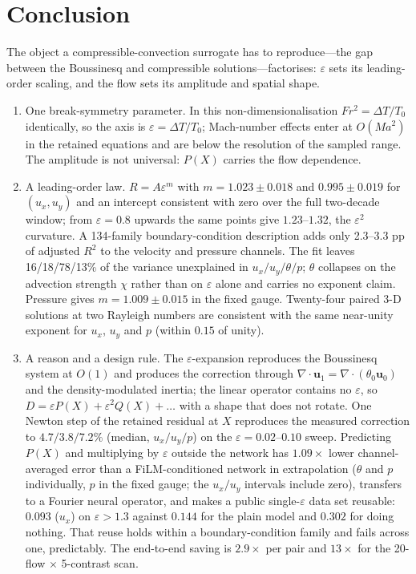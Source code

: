 \documentclass[preprint,11pt,a4paper,times,doubleblind]{elsarticle}
\begin{document}
\section{Conclusion}
\label{sec:conclusion}

The object a compressible-convection surrogate has to reproduce---the gap between the Boussinesq
and compressible solutions---factorises: $\varepsilon$ sets its leading-order scaling, and the flow
sets its amplitude and spatial shape.

\begin{enumerate}
\item One break-symmetry parameter. In this non-dimensionalisation $Fr^2=\Delta T/T_0$
identically, so the axis is $\varepsilon=\Delta T/T_0$; Mach-number effects enter at $O(Ma^2)$ in
the retained equations and are below the resolution of the sampled range. The amplitude is not
universal: $P(X)$ carries the flow dependence.
\item A leading-order law. $R=A\varepsilon^m$ with $m=1.023\pm0.018$ and $0.995\pm0.019$ for
$(u_x,u_y)$ and an intercept consistent with zero over the full two-decade window; from
$\varepsilon=0.8$ upwards the same points give $1.23$--$1.32$, the $\varepsilon^2$ curvature. A
134-family boundary-condition description adds only 2.3--3.3 pp of adjusted $R^2$ to the velocity
and pressure channels. The fit leaves 16/18/78/13\% of the variance unexplained in
$u_x/u_y/\theta/p$; $\theta$ collapses on the advection strength $\chi$ rather than on
$\varepsilon$ alone and carries no exponent claim. Pressure gives $m=1.009\pm0.015$ in the fixed
gauge. Twenty-four paired 3-D solutions at two Rayleigh numbers are consistent with the same
near-unity exponent for $u_x$, $u_y$ and $p$ (within $0.15$ of unity).
\item A reason and a design rule. The $\varepsilon$-expansion reproduces the Boussinesq system at
$O(1)$ and produces the correction through $\nabla\cdot\bm u_1=\nabla\cdot(\theta_0\bm u_0)$ and
the density-modulated inertia; the linear operator contains no $\varepsilon$, so
$D=\varepsilon P(X)+\varepsilon^2Q(X)+\dots$ with a shape that does not rotate. One Newton step of
the retained residual at $X$ reproduces the measured correction to $4.7/3.8/7.2\%$ (median,
$u_x/u_y/p$) on the $\varepsilon=0.02$--$0.10$ sweep. Predicting $P(X)$ and multiplying by
$\varepsilon$ outside the network has $1.09\times$ lower channel-averaged error than a
FiLM-conditioned network in extrapolation ($\theta$ and $p$ individually, $p$ in the fixed gauge;
the $u_x/u_y$ intervals include zero), transfers to a Fourier neural operator, and makes a public
single-$\varepsilon$ data set reusable: $0.093$ ($u_x$) on $\varepsilon>1.3$ against $0.144$ for
the plain model and $0.302$ for doing nothing. That reuse holds within a boundary-condition family
and fails across one, predictably. The end-to-end saving is $2.9\times$ per pair and $13\times$
for the 20-flow $\times$ 5-contrast scan.
\end{enumerate}
\end{document}
